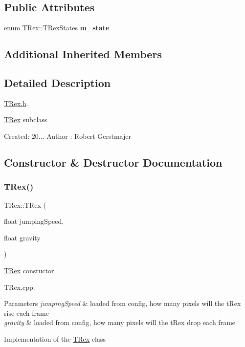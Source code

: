\subsection*{Public Attributes}
\begin{DoxyCompactItemize}
\item 
\mbox{\label{class_t_rex_ad30ad91fa9d6bb28c00e5d4819720d76}} 
enum T\+Rex\+::\+T\+Rex\+States {\bfseries m\+\_\+state}
\end{DoxyCompactItemize}
\subsection*{Additional Inherited Members}


\subsection{Detailed Description}
\mbox{\hyperlink{_t_rex_8h_source}{T\+Rex.\+h}}. 

\mbox{\hyperlink{class_t_rex}{T\+Rex}} subclass

Created\+: 20... Author \+: Robert Gerstmajer 

\subsection{Constructor \& Destructor Documentation}
\mbox{\label{class_t_rex_ae762432f9b24294e971b9f62191f26e9}} 
\subsubsection{\texorpdfstring{T\+Rex()}{TRex()}}
{\footnotesize\ttfamily T\+Rex\+::\+T\+Rex (\begin{DoxyParamCaption}\item[{float}]{jumping\+Speed,  }\item[{float}]{gravity }\end{DoxyParamCaption})}



\mbox{\hyperlink{class_t_rex}{T\+Rex}} constuctor. 

T\+Rex.\+cpp.


\begin{DoxyParams}{Parameters}
{\em jumping\+Speed} & loaded from config, how many pixels will the t\+Rex rise each frame \\
\hline
{\em gravity} & loaded from config, how many pixels will the t\+Rex drop each frame\\
\hline
\end{DoxyParams}
Implementation of the \mbox{\hyperlink{class_t_rex}{T\+Rex}} class

